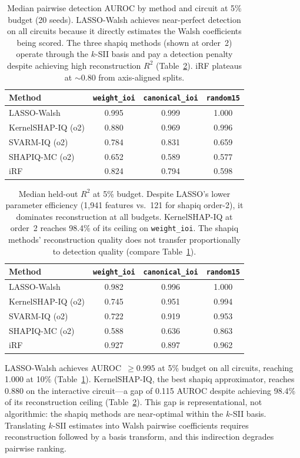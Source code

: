 \documentclass[11pt]{article}
\begin{document}
\begin{table}[t]
\centering
\caption{Median pairwise detection AUROC by method and circuit at 5\%
budget (20 seeds). LASSO-Walsh achieves near-perfect detection on all
circuits because it directly estimates the Walsh coefficients being
scored. The three shapiq methods (shown at order~2) operate through
the $k$-SII basis and pay a detection penalty despite achieving high
reconstruction $R^2$ (Table~\ref{tab:r2}). iRF plateaus at
$\sim$0.80 from axis-aligned splits.}
\label{tab:auroc}
\begin{tabular}{lccc}
\toprule
Method & \texttt{weight\_ioi} & \texttt{canonical\_ioi} & \texttt{random15} \\
\midrule
LASSO-Walsh        & 0.995 & 0.999 & 1.000 \\
KernelSHAP-IQ (o2) & 0.880 & 0.969 & 0.996 \\
SVARM-IQ (o2)      & 0.784 & 0.831 & 0.659 \\
SHAPIQ-MC (o2)     & 0.652 & 0.589 & 0.577 \\
iRF                & 0.824 & 0.794 & 0.598 \\
\bottomrule
\end{tabular}
\end{table}

\begin{table}[t]
\centering
\caption{Median held-out $R^2$ at 5\% budget. Despite LASSO's lower
parameter efficiency (1{,}941 features vs.\ 121 for shapiq order-2),
it dominates reconstruction at all budgets. KernelSHAP-IQ at order~2
reaches 98.4\% of its ceiling on \texttt{weight\_ioi}. The shapiq
methods' reconstruction quality does not transfer proportionally to
detection quality (compare Table~\ref{tab:auroc}).}
\label{tab:r2}
\begin{tabular}{lccc}
\toprule
Method & \texttt{weight\_ioi} & \texttt{canonical\_ioi} & \texttt{random15} \\
\midrule
LASSO-Walsh        & 0.982 & 0.996 & 1.000 \\
KernelSHAP-IQ (o2) & 0.745 & 0.951 & 0.994 \\
SVARM-IQ (o2)      & 0.722 & 0.919 & 0.953 \\
SHAPIQ-MC (o2)     & 0.588 & 0.636 & 0.863 \\
iRF                & 0.927 & 0.897 & 0.962 \\
\bottomrule
\end{tabular}
\end{table}

LASSO-Walsh achieves AUROC~$\geq 0.995$ at 5\% budget on all
circuits, reaching 1.000 at 10\% (Table~\ref{tab:auroc}).
KernelSHAP-IQ, the best shapiq approximator, reaches 0.880 on the
interactive circuit---a gap of 0.115 AUROC despite achieving 98.4\%
of its reconstruction ceiling (Table~\ref{tab:r2}). This gap is
representational, not algorithmic: the shapiq methods are
near-optimal within the $k$-SII basis. Translating $k$-SII estimates
into Walsh pairwise coefficients requires reconstruction followed by
a basis transform, and this indirection degrades pairwise ranking.
\end{document}
